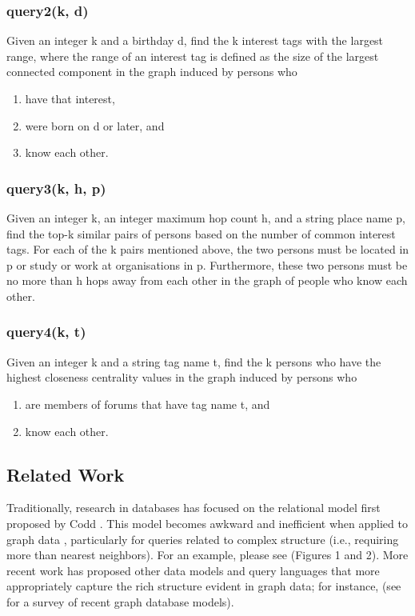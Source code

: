 \documentclass{article}
\begin{document}
\subsubsection{query2(k, d)}
Given an integer k and a birthday d, find the k interest tags with the largest range, where the range of an interest tag is defined as the size of the largest connected component in the graph induced by persons who
\begin{enumerate}
\item have that interest,
\item were born on d or later, and
\item know each other.
\end{enumerate}

\subsubsection{query3(k, h, p)}
Given an integer k, an integer maximum hop count h, and a string place
name p, find the top-k similar pairs of persons based on the number of
common interest tags. For each of the k pairs mentioned above, the two
persons must be located in p or study or work at organisations in
p. Furthermore, these two persons must be no more than h hops away
from each other in the graph of people who know each other.

\subsubsection{query4(k, t)}
Given an integer k and a string tag name t, find the k persons who
have the highest closeness centrality values in the graph induced by
persons who
\begin{enumerate}
\item are members of forums that have tag name t, and
\item know each other.
\end{enumerate}


\subsection{Related Work}
Traditionally, research in databases has focused on the relational
model first proposed by Codd \cite{codd1970relational}.  This model
becomes awkward and inefficient when applied to graph data
\cite{rodriguez2011graph}, particularly for queries related to
complex structure (i.e., requiring more than nearest neighbors).  For
an example, please see \cite{he2008graphs} (Figures 1 and 2).  More
recent work has proposed other data models and query languages that
more appropriately capture the rich structure evident in graph data;
for instance,
\cite{he2008graphs,sun2012efficient,low2010graphlab} (see
\cite{angles2008survey} for a survey of recent graph database
models).  
\end{document}
